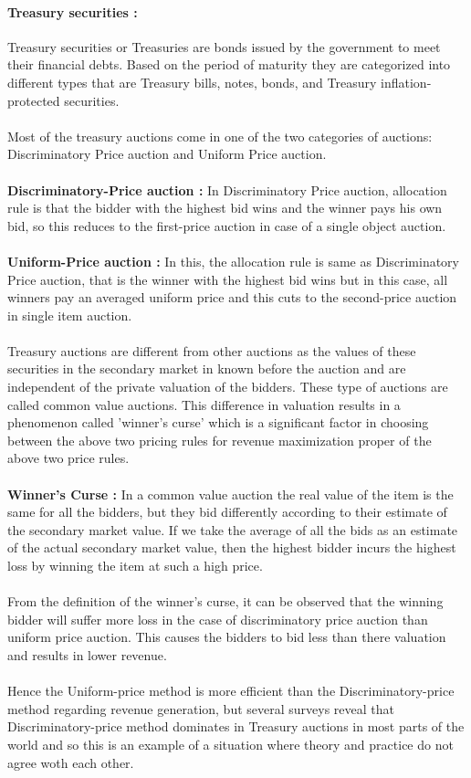 \documentclass[a4paper]{article}
\begin{document}
\paragraph{Treasury securities :}Treasury securities or Treasuries are bonds issued by the government to meet their financial debts. Based on the period of maturity they are categorized into different types that are Treasury bills, notes, bonds, and Treasury inflation-protected securities.
\\\\
Most of the treasury auctions come in one of the two categories of auctions: Discriminatory Price auction and Uniform Price auction.
\\\\
\textbf{Discriminatory-Price auction :} In Discriminatory Price auction, allocation rule is that the bidder with the highest bid wins and the winner pays his own bid, so this reduces to the first-price auction in case of a single object auction.
\\\\
\textbf{Uniform-Price auction :} In this, the allocation rule is same as Discriminatory Price auction, that is the winner with the highest bid wins but in this case, all winners pay an averaged uniform price and this cuts to the second-price auction in single item auction.
\\\\
Treasury auctions are different from other auctions as the values of these securities in the secondary market in known before the auction and are independent of the private valuation of the bidders. These type of auctions are called common value auctions. This difference in valuation results in a phenomenon called 'winner's curse' which is a significant factor in choosing between the above two pricing rules for revenue maximization proper of the above two price rules.
\\\\
\textbf{Winner's Curse :} In a common value auction the real value of the item is the same for all the bidders, but they bid differently according to their estimate of the secondary market value. If we take the average of all the bids as an estimate of the actual secondary market value, then the highest bidder incurs the highest loss by winning the item at such a high price.
\\\\
From the definition of the winner's curse, it can be observed that the winning bidder will suffer more loss in the case of discriminatory price auction than uniform price auction. This causes the bidders to bid less than there valuation and results in lower revenue.
\\\\
Hence the Uniform-price method is more efficient than the Discriminatory-price method regarding revenue generation, but several surveys reveal that Discriminatory-price method dominates in Treasury auctions in most parts of the world and so this is an example of a situation where theory and practice do not agree woth each other.
\end{document}
